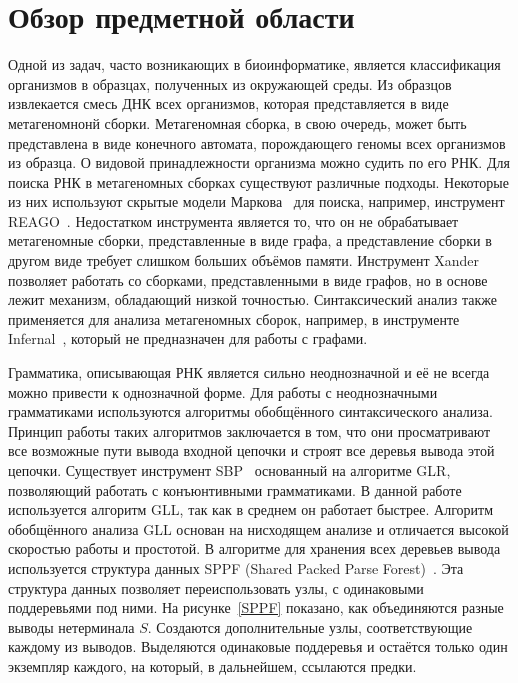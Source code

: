 
\section{Обзор предметной области}
Одной из задач, часто возникающих в биоинформатике, является классификация организмов в образцах, полученных из окружающей среды. Из образцов извлекается смесь ДНК всех организмов, которая представляется в виде метагеномнонй сборки. Метагеномная сборка, в свою очередь, может быть представлена в виде конечного автомата, порождающего геномы всех организмов из образца. О видовой принадлежности организма можно судить по его РНК. Для поиска РНК в метагеномных сборках существуют различные подходы. Некоторые из них используют скрытые модели Маркова~\cite{markov} для поиска, например, инструмент REAGO~\cite{REAGO}. Недостатком инструмента является то, что он не обрабатывает метагеномные сборки, представленные в виде графа, а представление сборки в другом виде требует слишком больших объёмов памяти. Инструмент Xander~\cite{Xander} позволяет работать со сборками, представленными в виде графов, но в основе лежит механизм, обладающий низкой точностью. Синтаксический анализ также применяется для анализа метагеномных сборок, например, в инструменте Infernal~\cite{Infernal}, который не предназначен для работы с графами.

Грамматика, описывающая РНК является сильно неоднозначной и её не всегда можно привести к однозначной форме. Для работы с неоднозначными грамматиками используются алгоритмы обобщённого синтаксического анализа. Принцип работы таких алгоритмов заключается в том, что они просматривают все возможные пути вывода входной цепочки и строят все деревья вывода этой цепочки. Существует инструмент SBP~\cite{SBP} основанный на алгоритме GLR, позволяющий работать с конъюнтивными грамматиками. В данной работе используется алгоритм GLL, так как в среднем он работает быстрее. Алгоритм обобщённого анализа GLL основан на нисходящем анализе и отличается высокой скоростью работы и простотой. В алгоритме для хранения всех деревьев вывода используется структура данных SPPF (Shared Packed Parse Forest)~\cite{SPPF}. Эта структура данных позволяет переиспользовать узлы, с одинаковыми поддеревьями под ними. На рисунке~\ref{SPPF} показано, как объединяются разные выводы нетерминала $ S $. Создаются дополнительные узлы, соответствующие каждому из выводов. Выделяются одинаковые поддеревья и остаётся только один экземпляр каждого, на который, в дальнейшем, ссылаются предки.

